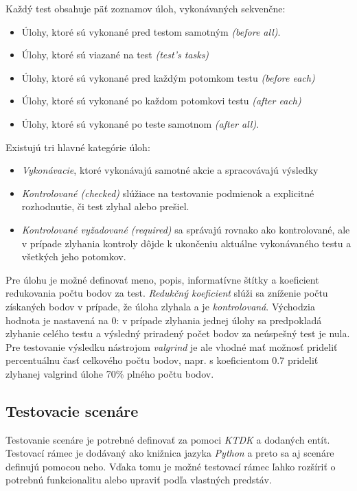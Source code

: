 \documentclass[
  digital, %
  twoside, %
  table,   %
  lof,     %
  lot,     %
]{fithesis3}
\begin{document}
Každý test obsahuje päť zoznamov úloh, vykonávaných sekvenčne:
\begin{itemize}
    \item Úlohy, ktoré sú vykonané pred testom samotným \emph{(before all)}.
    \item Úlohy, ktoré sú viazané na test \emph{(test's tasks)}
    \item Úlohy, ktoré sú vykonané pred každým potomkom testu \emph{(before each)} 
    \item Úlohy, ktoré sú vykonané po každom potomkovi testu \emph{(after each)}
    \item Úlohy, ktoré sú vykonané po teste samotnom \emph{(after all)}.
\end{itemize}

Existujú tri hlavné kategórie úloh:
\begin{itemize}
    \item \emph{Vykonávacie}, ktoré vykonávajú samotné akcie a spracovávajú výsledky
    \item \emph{Kontrolované (checked)} slúžiace na testovanie podmienok a explicitné rozhodnutie, či test zlyhal alebo prešiel.
    \item \emph{Kontrolované vyžadované (required)} sa správajú rovnako ako kontrolované, ale v prípade zlyhania kontroly dôjde k ukončeniu aktuálne vykonávaného testu a všetkých jeho potomkov.
\end{itemize}

Pre úlohu je možné definovať meno, popis, informatívne štítky a koeficient redukovania počtu bodov za test. \emph{Redukčný koeficient} slúži sa zníženie počtu získaných bodov v prípade, že úloha zlyhala a je \emph{kontrolovaná}. Východzia hodnota je nastavená na 0: v prípade zlyhania jednej úlohy sa predpokladá zlyhanie celého testu a výsledný priradený počet bodov za neúspešný test je nula. Pre testovanie výsledku nástrojom \emph{valgrind} je ale vhodné mať možnosť prideliť percentuálnu časť celkového počtu bodov, napr. s koeficientom 0.7 prideliť zlyhanej valgrind úlohe 70\% plného počtu bodov.

\subsection{Testovacie scenáre}

Testovanie scenáre je potrebné definovať za pomoci \emph{KTDK} a dodaných entít. Testovací rámec je dodávaný ako knižnica jazyka \emph{Python} a preto sa aj scenáre definujú pomocou neho. Vďaka tomu je možné testovací rámec ľahko rozšíriť o potrebnú funkcionalitu alebo upraviť podľa vlastných predstáv. 
\end{document}
